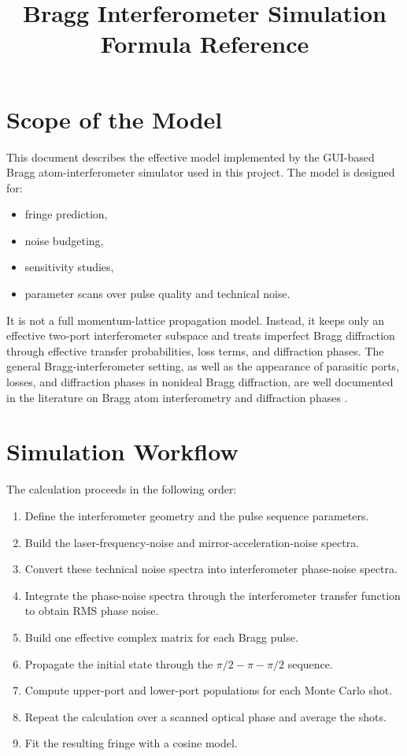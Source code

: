 \documentclass[11pt,a4paper]{article}
\title{Bragg Interferometer Simulation Formula Reference}
\author{}
\date{}
\begin{document}
\maketitle
\tableofcontents
\newpage

\section{Scope of the Model}

This document describes the effective model implemented by the GUI-based Bragg atom-interferometer simulator used in this project. The model is designed for:

\begin{itemize}[leftmargin=1.5em]
  \item fringe prediction,
  \item noise budgeting,
  \item sensitivity studies,
  \item parameter scans over pulse quality and technical noise.
\end{itemize}

It is not a full momentum-lattice propagation model. Instead, it keeps only an effective two-port interferometer subspace and treats imperfect Bragg diffraction through effective transfer probabilities, loss terms, and diffraction phases.
The general Bragg-interferometer setting, as well as the appearance of parasitic ports, losses, and diffraction phases in nonideal Bragg diffraction, are well documented in the literature on Bragg atom interferometry and diffraction phases \cite{Giltner1995,Muller2008,Estey2015,Parker2016,Jenewein2022}.

\section{Simulation Workflow}

The calculation proceeds in the following order:

\begin{enumerate}[leftmargin=1.8em]
  \item Define the interferometer geometry and the pulse sequence parameters.
  \item Build the laser-frequency-noise and mirror-acceleration-noise spectra.
  \item Convert these technical noise spectra into interferometer phase-noise spectra.
  \item Integrate the phase-noise spectra through the interferometer transfer function to obtain RMS phase noise.
  \item Build one effective complex matrix for each Bragg pulse.
  \item Propagate the initial state through the $\pi/2-\pi-\pi/2$ sequence.
  \item Compute upper-port and lower-port populations for each Monte Carlo shot.
  \item Repeat the calculation over a scanned optical phase and average the shots.
  \item Fit the resulting fringe with a cosine model.
\end{enumerate}
\end{document}
